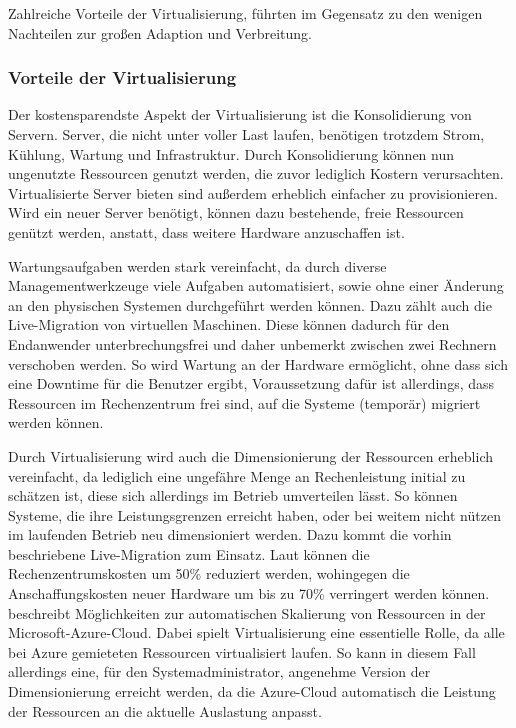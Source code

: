 Zahlreiche Vorteile der Virtualisierung, führten im Gegensatz zu den wenigen Nachteilen zur großen Adaption und Verbreitung.
\subsubsection{Vorteile der Virtualisierung \autocite[198]{Baun2009}}
Der kostensparendste Aspekt der Virtualisierung ist die Konsolidierung von Servern.
Server, die nicht unter voller Last laufen, benötigen trotzdem Strom, Kühlung, Wartung und Infrastruktur.
Durch Konsolidierung können nun ungenutzte Ressourcen genutzt werden, die zuvor lediglich Kostern verursachten.
Virtualisierte Server bieten sind außerdem erheblich einfacher zu provisionieren.
Wird ein neuer Server benötigt, können dazu bestehende, freie Ressourcen genützt werden, anstatt, dass weitere Hardware anzuschaffen ist.

Wartungsaufgaben werden stark vereinfacht, da durch diverse Managementwerkzeuge viele Aufgaben automatisiert, sowie ohne einer Änderung an den physischen Systemen durchgeführt werden können.
Dazu zählt auch die Live-Migration von virtuellen Maschinen.
Diese können dadurch für den Endanwender unterbrechungsfrei und daher unbemerkt zwischen zwei Rechnern verschoben werden.
So wird Wartung an der Hardware ermöglicht, ohne dass sich eine Downtime für die Benutzer ergibt, Voraussetzung dafür ist allerdings, dass Ressourcen im Rechenzentrum frei sind, auf die Systeme (temporär) migriert werden können.

Durch Virtualisierung wird auch die Dimensionierung der Ressourcen erheblich vereinfacht, da lediglich eine ungefähre Menge an Rechenleistung initial zu schätzen ist, diese sich allerdings im Betrieb umverteilen lässt.
So können Systeme, die ihre Leistungsgrenzen erreicht haben, oder bei weitem nicht nützen im laufenden Betrieb neu dimensioniert werden.
Dazu kommt die vorhin beschriebene Live-Migration zum Einsatz.
Laut \autocite{Hantelmann2008} können die Rechenzentrumskosten um 50\% reduziert werden, wohingegen die Anschaffungskosten neuer Hardware um bis zu 70\% verringert werden können.
\autocite{Azure-Scaling:online} beschreibt Möglichkeiten zur automatischen Skalierung von Ressourcen in der Microsoft-Azure-Cloud.
Dabei spielt Virtualisierung eine essentielle Rolle, da alle bei Azure gemieteten Ressourcen virtualisiert laufen.
So kann in diesem Fall allerdings eine, für den Systemadministrator, angenehme Version der Dimensionierung erreicht werden, da die Azure-Cloud automatisch die Leistung der Ressourcen an die aktuelle Auslastung anpasst.

